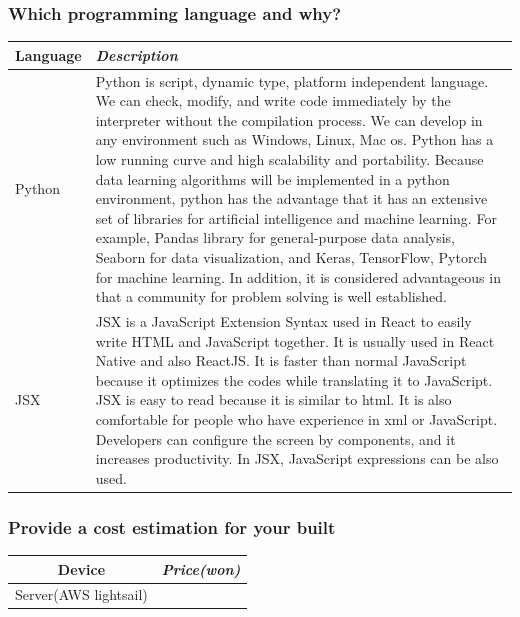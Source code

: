 \documentclass[conference]{IEEEtran}
\begin{document}
\subsubsection{Which programming language and why?}
\begin{table}[b!]
\begin{center}
\begin{tabular}{|p{}|p{}|}
\cline{1-2}
\textbf{Language} & \textbf{\textit{Description}} \\
\hline
Python&Python is script, dynamic type, platform independent language. 
We can check, modify, and write code immediately by the interpreter without the compilation process.
We can develop in any environment such as Windows, Linux, Mac os. 
Python has a low running curve and high scalability and portability. 
Because data learning algorithms will be implemented in a python environment, python has the advantage that it has an extensive set of libraries for artificial intelligence and machine learning. For example, Pandas library for general-purpose data analysis, Seaborn  for data visualization, and Keras, TensorFlow, Pytorch for machine learning. In addition, it is considered advantageous in that a community for problem solving is well established.\\
\hline
JSX&JSX is a JavaScript Extension Syntax used in React to easily write HTML and JavaScript together. It is usually used in React Native and also ReactJS. It is faster than normal JavaScript because it optimizes the codes while translating it to JavaScript. JSX is easy to read because it is similar to html. It is also comfortable for people who have experience in xml or JavaScript. Developers can configure the screen by components, and it increases productivity. In JSX, JavaScript expressions can be also used. \\
\hline
\end{tabular}
\label{tab1}
\end{center}
\end{table}


\subsubsection{Provide a cost estimation for your built}\;

\begin{table}[h!]
\begin{center}
\begin{tabular}{|c|c|}
\cline{1-2}
\textbf{Device} & \textbf{\textit{Price(won)}} \\
\hline
Server(AWS lightsail)&  \\ 
\hline
\end{tabular}
\label{tab1}
\end{center}
\end{table}
\end{document}
